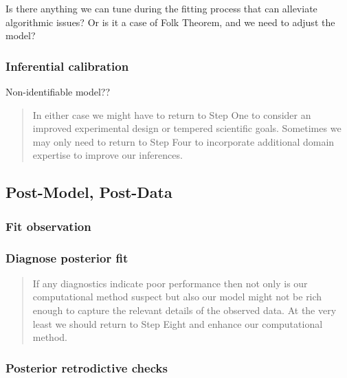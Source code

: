 \documentclass[11pt, oneside, openany]{scrbook}
\begin{document}
Is there anything we can tune during the fitting process that can alleviate algorithmic issues? Or is it a case of Folk Theorem, and we need to adjust the model?

\hypertarget{inferential-calibration}{%
\subsubsection{Inferential calibration}\label{inferential-calibration}}

Non-identifiable model??

\begin{quote}
In either case we might have to return to Step One to consider an improved experimental design or tempered scientific goals. Sometimes we may only need to return to Step Four to incorporate additional domain expertise to improve our inferences.
\end{quote}

\hypertarget{post-model-post-data}{%
\subsection{Post-Model, Post-Data}\label{post-model-post-data}}

\hypertarget{fit-observation}{%
\subsubsection{Fit observation}\label{fit-observation}}

\hypertarget{diagnose-posterior-fit}{%
\subsubsection{Diagnose posterior fit}\label{diagnose-posterior-fit}}

\begin{quote}
If any diagnostics indicate poor performance then not only is our computational method suspect but also our model might not be rich enough to capture the relevant details of the observed data. At the very least we should return to Step Eight and enhance our computational method.
\end{quote}

\hypertarget{posterior-retrodictive-checks}{%
\subsubsection{Posterior retrodictive checks}\label{posterior-retrodictive-checks}}
\end{document}
